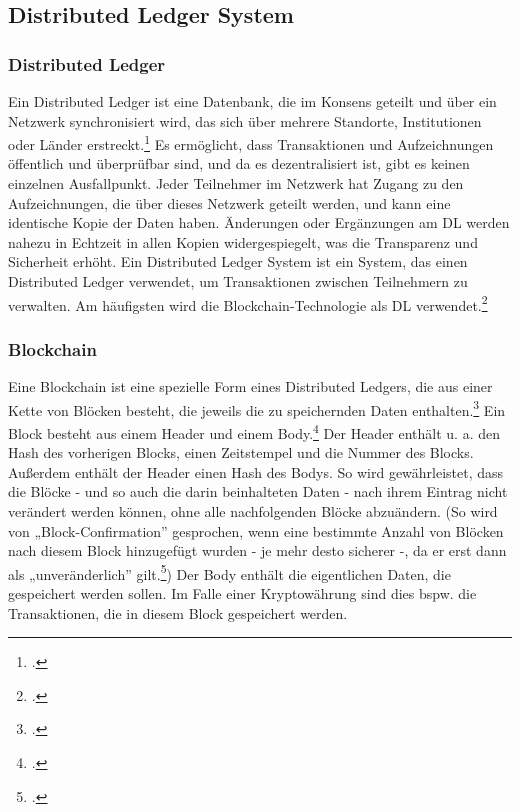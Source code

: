 \noindent

\subsection{Distributed Ledger System}
\label{sec:definition-dls}

\subsubsection{Distributed Ledger}
\label{sec:definition-distributed-ledger}
Ein Distributed Ledger ist eine Datenbank, die im Konsens geteilt und über ein Netzwerk synchronisiert wird, das sich über mehrere Standorte, Institutionen oder Länder erstreckt.\footcite[Vgl. hierzu und im Folgenden][]{w1,w2} 
Es ermöglicht, dass Transaktionen und Aufzeichnungen öffentlich und überprüfbar sind, und da es dezentralisiert ist, gibt es keinen einzelnen Ausfallpunkt. 
Jeder Teilnehmer im Netzwerk hat Zugang zu den Aufzeichnungen, die über dieses Netzwerk geteilt werden, und kann eine identische Kopie der Daten haben. Änderungen oder Ergänzungen am DL werden nahezu in Echtzeit in allen Kopien widergespiegelt, was die Transparenz und Sicherheit erhöht.
\bigbreak
\noindent
Ein Distributed Ledger System ist ein System, das einen Distributed Ledger verwendet, um Transaktionen zwischen Teilnehmern zu verwalten. Am häufigsten wird die Blockchain-Technologie als DL verwendet.\footcite[Vgl.][]{w3}
\subsubsection{Blockchain}
\label{sec:definition-blockchain}
Eine Blockchain ist eine spezielle Form eines Distributed Ledgers, die aus einer Kette von Blöcken besteht, die jeweils die zu speichernden Daten enthalten.\footcite[Vgl.][16]{q3} 
Ein Block besteht aus einem Header und einem Body.\footcites[Vgl. hierzu und im Folgenden][S. 161 ff\adddot]{q5}[]{w9}
\bigbreak
\noindent
Der Header enthält u. a. den Hash des vorherigen Blocks, einen Zeitstempel und die Nummer des Blocks.
Außerdem enthält der Header einen Hash des Bodys.
So wird gewährleistet, dass die Blöcke - und so auch die darin beinhalteten Daten - nach ihrem Eintrag nicht verändert werden können, ohne alle nachfolgenden Blöcke abzuändern. 
(So wird von „Block-Confirmation” gesprochen, wenn eine bestimmte Anzahl von Blöcken nach diesem Block hinzugefügt wurden - je mehr desto sicherer -, da er erst dann als „unveränderlich” gilt.\footcites[Vgl.][191]{q5})
\bigbreak
\noindent
Der Body enthält die eigentlichen Daten, die gespeichert werden sollen. Im Falle einer Kryptowährung sind dies bspw. die Transaktionen, die in diesem Block gespeichert werden.

